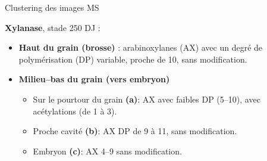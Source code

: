 \documentclass[10pt]{beamer}
\begin{document}
\begin{frame}{Clustering des images MS}
  
  \textbf{Xylanase}, stade 250 DJ :
    \begin{itemize}
    \item \textbf{Haut du grain (brosse) }: arabinoxylanes (AX) avec un degré de polymérisation (DP) variable, proche de 10, sans modification.
    \item \textbf{Milieu--bas du grain (vers embryon)}
      \begin{itemize}
      \item Sur le pourtour du grain \textbf{(a)}: AX avec faibles DP (5--10), avec acétylations (de 1 à 3).
      \item Proche cavité \textbf{(b)}: AX DP de 9 à 11, sans modification.
      \item Embryon \textbf{(c)}: AX 4--9 sans modification.
      \end{itemize}
    \end{itemize}


\end{frame}
\end{document}
